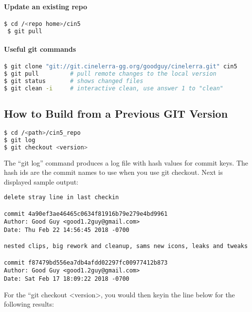 \paragraph{Update an existing repo}%
\label{par:update_an_existing_repo}

\begin{lstlisting}[language=bash]
 $ cd /<repo home>/cin5
 $ git pull
\end{lstlisting}

\paragraph{Useful git commands}%
\label{par:useful_git_commands}


\begin{lstlisting}[language=bash]
$ git clone "git://git.cinelerra-gg.org/goodguy/cinelerra.git" cin5
$ git pull         # pull remote changes to the local version
$ git status       # shows changed files
$ git clean -i     # interactive clean, use answer 1 to "clean"
\end{lstlisting}



\subsection{How to Build from a Previous GIT Version}%
\label{sub:how_to_build_from_a_previous_git_version}


\begin{lstlisting}[language=bash]
$ cd /<path>/cin5_repo
$ git log
$ git checkout <version>
\end{lstlisting}


The “git log” command produces a log file with hash values for commit keys.  The hash ids are the commit names to use when you use git checkout.  
Next is displayed sample output:


\begin{lstlisting}
delete stray line in last checkin

commit 4a90ef3ae46465c0634f81916b79e279e4bd9961
Author: Good Guy <good1.2guy@gmail.com>
Date: Thu Feb 22 14:56:45 2018 -0700

nested clips, big rework and cleanup, sams new icons, leaks and tweaks

commit f87479bd556ea7db4afdd02297fc00977412b873
Author: Good Guy <good1.2guy@gmail.com>
Date: Sat Feb 17 18:09:22 2018 -0700
\end{lstlisting}

For the “git checkout <version>, you would then keyin the line below for the following results:

